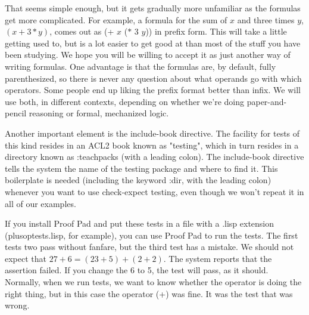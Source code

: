 That seems simple enough, but it gets gradually more unfamiliar
as the formulas get more complicated.
For example, a formula for the sum of $x$ and three times $y$, $(x + 3*y)$,
comes out as \textsf{(+ $x$ ($*$ 3 $y$))} in prefix form.
This will take a little getting used to,
but is a lot easier to get good at than
most of the stuff you have been studying.
We hope you will be willing to accept it as just another way of writing formulas.
One advantage is that the formulas are, by default, fully parenthesized,
so there is never any question about what operands go with which operators.
Some people end up liking the prefix format better than infix.
We will use both, in different contexts, depending on whether
we're doing paper-and-pencil reasoning or formal, mechanized logic.

Another important element is the
\textsf{include-book}
directive.
The facility for tests of this kind resides in an ACL2 book
known as "\textsf{testing}", which in turn resides in a directory known
as
\textsf{:teachpacks} (with a leading colon).
The \textsf{include-book} directive tells the system
the name of the testing package and where to find it.
This boilerplate is needed (including the keyword \textsf{:dir}, with the leading colon)
whenever you want to use \textsf{check-expect} testing,
even though we won't repeat it in all of our examples.

If you install Proof Pad and put these tests in a file
with a .lisp extension (plusoptests.lisp, for example),
you can use Proof Pad to run the tests.
The first tests two pass without fanfare,
but the third test has a mistake.
We should not expect that $27 + 6 = (23 + 5) + (2 + 2)$.
The system reports that the assertion failed.
If you change the 6 to 5, the test will pass, as it should.
Normally, when we run tests, we want to know whether the
operator is doing the right thing,
but in this case the operator (\textsf{+}) was fine.
It was the test that was wrong.

